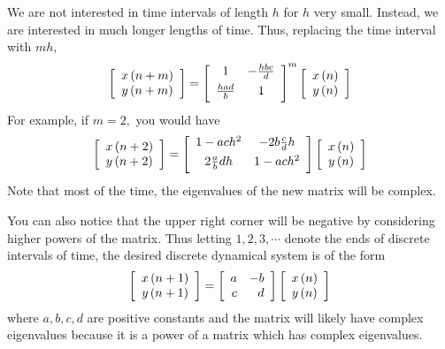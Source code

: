 We are not interested in time intervals of length $h$ for $h$ very small.
Instead, we are interested in much longer lengths of time. Thus, replacing
the time interval with $mh,$
\begin{equation*}
\leftB
\begin{array}{c}
x\left( n+m\right) \\
y\left( n+m\right)
\end{array}
\rightB =\leftB
\begin{array}{cc}
1 & -\vspace{0.05in}\frac{hbc}{d} \\
\vspace{0.05in}\frac{had}{b} & 1
\end{array}
\rightB ^{m}\leftB
\begin{array}{c}
x\left( n\right) \\
y\left( n\right)
\end{array}
\rightB
\end{equation*}
For example, if $m=2,$ you would have
\begin{equation*}
\leftB
\begin{array}{c}
x\left( n+2\right) \\
y\left( n+2\right)
\end{array}
\rightB =\leftB
\begin{array}{cc}
1-ach^{2} & -2b\vspace{0.05in}\frac{c}{d}h \\
2\vspace{0.05in}\frac{a}{b}dh & 1-ach^{2}
\end{array}
\rightB \leftB
\begin{array}{c}
x\left( n\right) \\
y\left( n\right)
\end{array}
\rightB
\end{equation*}
Note that most of the time, the eigenvalues of the new matrix will be complex.

You can also notice that the upper right corner will be negative by
considering higher powers of the matrix. Thus letting $1,2,3,\cdots $ denote
the ends of discrete intervals of time, the desired discrete dynamical
system is of the form
\begin{equation*}
\left[
\begin{array}{c}
x\left( n+1\right) \\
y\left( n+1\right)
\end{array}
\right] =\left[
\begin{array}{rr}
a & -b \\
c & d
\end{array}
\right] \left[
\begin{array}{c}
x\left( n\right) \\
y\left( n\right)
\end{array}
\right]
\end{equation*}
where $a,b,c,d$ are positive constants and the matrix will likely have
complex eigenvalues because it is a power of a matrix which has complex
eigenvalues.


